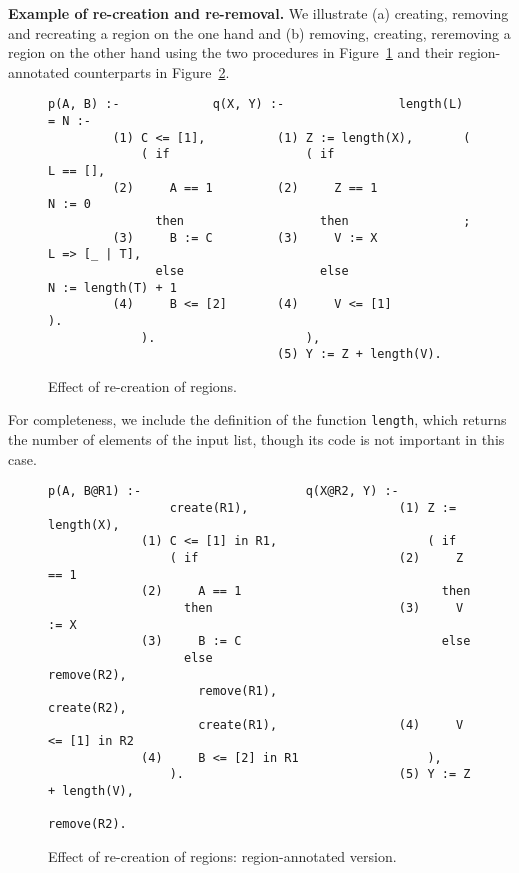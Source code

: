 \documentclass{tlp}
\newcommand{\code}[1]{{\tt#1}}
\begin{document}
\noindent\textbf{Example of re-creation and re-removal.}
We illustrate (a) creating, removing and recreating a region on the one hand
and (b) removing, creating, reremoving a region on the other hand
using the two procedures in Figure~\ref{fig:recreate:normal}
and their region-annotated counterparts in Figure~\ref{fig:recreate:annotated}.
\begin{figure}[tb]
\scriptsize
\vspace{2mm}
\begin{Verbatim}[frame=single,framerule=0.2pt,framesep=3pt]
p(A, B) :-             q(X, Y) :-                length(L) = N :-
         (1) C <= [1],          (1) Z := length(X),       (
             ( if                   ( if                      L == [],
         (2)     A == 1         (2)     Z == 1                N := 0
               then                   then                ;
         (3)     B := C         (3)     V := X                L => [_ | T],
               else                   else                    N := length(T) + 1
         (4)     B <= [2]       (4)     V <= [1]          ).
             ).                     ),
                                (5) Y := Z + length(V).
\end{Verbatim}
\small
\caption{Effect of re-creation of regions.}
\label{fig:recreate:normal}
\normalsize
\end{figure}
For completeness,
we include the definition of the function \code{length},
which returns the number of elements of the input list,
though its code is not important in this case.
\begin{figure}[tb]
\scriptsize
\vspace{2mm}
\begin{Verbatim}[frame=single,framerule=0.2pt,framesep=3pt]
             p(A, B@R1) :-                       q(X@R2, Y) :-
                 create(R1),                     (1) Z := length(X),
             (1) C <= [1] in R1,                     ( if
                 ( if                            (2)     Z == 1
             (2)     A == 1                            then
                   then                          (3)     V := X
             (3)     B := C                            else
                   else                                  remove(R2),
                     remove(R1),                         create(R2),
                     create(R1),                 (4)     V <= [1] in R2
             (4)     B <= [2] in R1                  ),
                 ).                              (5) Y := Z + length(V),
                                                     remove(R2).
\end{Verbatim}
\small
\caption{Effect of re-creation of regions: region-annotated version.}
\label{fig:recreate:annotated}
\normalsize
\end{figure}
\end{document}
